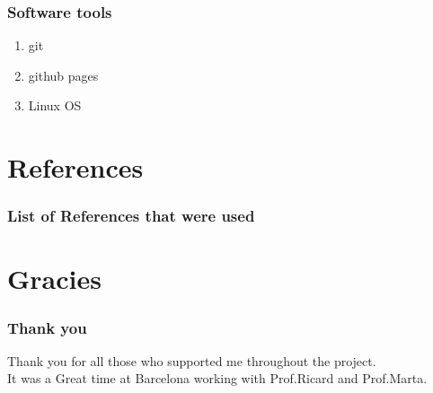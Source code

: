 \documentclass{beamer}
\begin{document}
\frame
{
	\frametitle{Software tools}
	\begin{enumerate}
		\item git
		\item github pages
		\item Linux OS
	\end{enumerate}
}



\section{References}

\frame
{
	\frametitle{List of References that were used}


{}
}

\section{Gracies}
\frame
{
	\frametitle{Thank you}
Thank you for all those who supported me throughout the project.\\
It was a Great time at Barcelona working with Prof.Ricard and Prof.Marta.

}
\end{document}
